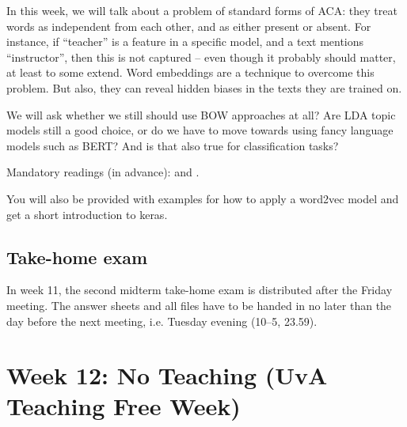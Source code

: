 In this week, we will talk about a problem of standard forms of ACA: they treat words as independent from each other, and as either present or absent. For instance, if ``teacher'' is a feature in a specific model, and a text mentions ``instructor'', then this is not captured -- even though it probably should matter, at least to some extend. Word embeddings are a technique to overcome this problem. But also, they can reveal hidden biases in the texts they are trained on.

We will ask whether we still should use BOW approaches at all? Are LDA topic models still a good choice, or do we have to move towards using fancy language models such as BERT? And is that also true for classification tasks?






Mandatory readings (in advance): \cite{Kusner2015} and \cite{Garg2017}.


You will also be provided with examples for how to apply a word2vec model and get a short introduction to keras.




\subsection*{Take-home exam}
In week 11, the second midterm take-home exam is distributed after the Friday meeting. The answer sheets and all files have to be handed in no later than the day before the next meeting, i.e. Tuesday evening (10--5, 23.59).





\section*{Week 12: No Teaching (UvA Teaching Free Week)}




